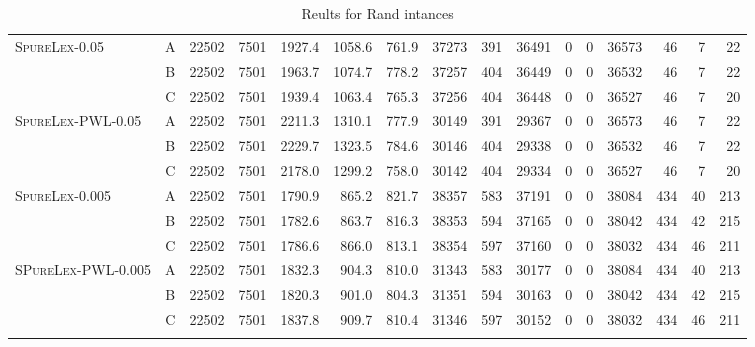 \documentclass{article}
\begin{document}
\begin{table}[htb]
\begin{tabular}{l|c|rr|rrr|rrrrrr|rrr}
\hline
\textsc{SpureLex}-0.05 & A & 22502 & 7501 & 1927.4 & 1058.6 & 761.9 &  37273 & 391 & 36491 & 0 & 0 & 36573 & 46 & 7 & 22 \\
& B & 22502 & 7501 & 1963.7 & 1074.7 & 778.2 &  37257 & 404 & 36449 & 0 & 0 & 36532 & 46 & 7 & 22 \\
& C & 22502 & 7501 & 1939.4 & 1063.4 & 765.3 &  37256 & 404 & 36448 & 0 & 0 & 36527 & 46 & 7 & 20 \\
\hline

\textsc{SpureLex-PWL}-0.05 & A & 22502 & 7501 & 2211.3 & 1310.1 & 777.9 &  30149 & 391 & 29367 & 0 & 0 & 36573 & 46 & 7 & 22 \\
& B & 22502 & 7501 & 2229.7 & 1323.5 & 784.6 &  30146 & 404 & 29338 & 0 & 0 & 36532 & 46 & 7 & 22 \\
& C & 22502 & 7501 & 2178.0 & 1299.2 & 758.0 &  30142 & 404 & 29334 & 0 & 0 & 36527 & 46 & 7 & 20 \\

\hline
\textsc{SpureLex}-0.005 & A & 22502 & 7501 & 1790.9 & 865.2 & 821.7 &  38357 & 583 & 37191 & 0 & 0 & 38084 & 434 & 40 & 213 \\
& B & 22502 & 7501 & 1782.6 & 863.7 & 816.3 &  38353 & 594 & 37165 & 0 & 0 & 38042 & 434 & 42 & 215 \\
& C & 22502 & 7501 & 1786.6 & 866.0 & 813.1 &  38354 & 597 & 37160 & 0 & 0 & 38032 & 434 & 46 & 211 \\
\hline

\textsc{SPureLex-PWL}-0.005 & A & 22502 & 7501 & 1832.3 & 904.3 & 810.0 &  31343 & 583 & 30177 & 0 & 0 & 38084 & 434 & 40 & 213 \\
& B & 22502 & 7501 & 1820.3 & 901.0 & 804.3 &  31351 & 594 & 30163 & 0 & 0 & 38042 & 434 & 42 & 215 \\
& C & 22502 & 7501 & 1837.8 & 909.7 & 810.4 &  31346 & 597 & 30152 & 0 & 0 & 38032 & 434 & 46 & 211 \\
\hline
		\noalign{\smallskip}
        \lasthline
        
	\end{tabular}
	
	\caption{Reults for Rand intances}
\end{table}
\end{document}
